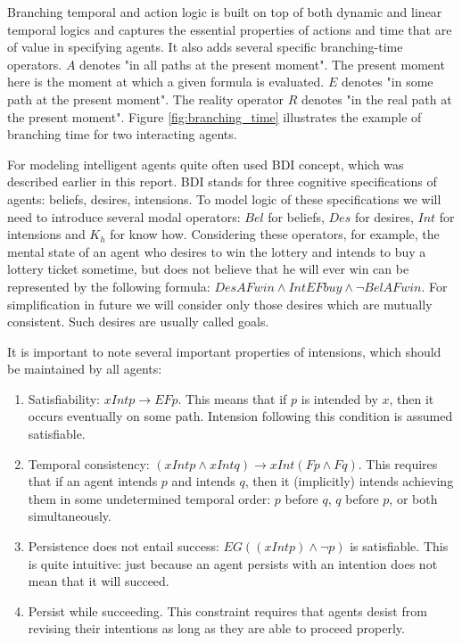 Branching temporal and action logic is built on top of both dynamic and linear temporal logics and captures the essential properties of actions and time that are of value in specifying agents. It also adds several specific branching-time operators. $A$ denotes "in all paths at the present moment". The present moment here is the moment at which a given formula is evaluated. $E$ denotes "in some path at the present moment". The reality operator $R$ denotes "in the real path at the present moment". Figure \ref{fig:branching_time} illustrates the example of branching time for two interacting agents.

For modeling intelligent agents quite often used BDI concept, which was described earlier in this report. BDI stands for three cognitive specifications of agents: beliefs, desires, intensions. To model logic of these specifications we will need to introduce several modal operators: $Bel$ for beliefs, $Des$ for desires, $Int$ for intensions and $K_h$ for know how. Considering these operators, for example, the mental state of an agent who desires to win the lottery and intends to buy a lottery ticket sometime, but does not believe that he will ever win can be represented by the following formula: $DesAFwin \land IntEFbuy \land \neg BelAFwin$. For simplification in future we will consider only those desires which are mutually consistent. Such desires are usually called goals.

It is important to note several important properties of intensions, which should be maintained by all agents\cite{Singh_92}:
\begin{enumerate}
  \item Satisfiability: $xIntp\rightarrow EFp$. This means that if $p$ is intended by $x$, then it occurs eventually on some path. Intension following this condition is assumed satisfiable.
  \item Temporal consistency: $(xIntp \land xIntq)\rightarrow xInt(Fp \land Fq)$. This requires that if an agent intends $p$ and intends $q$, then it  (implicitly) intends achieving them in some undetermined temporal order: $p$ before $q$, $q$ before $p$, or both simultaneously.
  \item Persistence does not entail success: $EG((xIntp) \land \neg p)$ is satisfiable. This is quite intuitive: just because an agent persists with an intention does not mean that it will succeed.
  \item Persist while succeeding. This constraint requires that agents desist from revising their intentions as long as they are able to proceed properly.
\end{enumerate}

